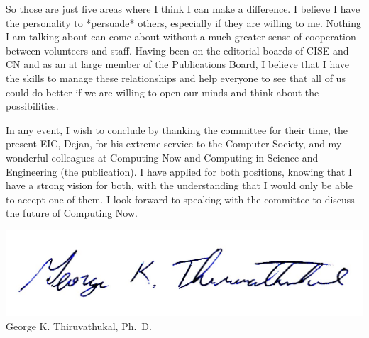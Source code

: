 \documentclass[11pt,english]{luclet}
\begin{document}
So those are just five areas where I think I can make a difference. I believe
I have the personality to *persuade* others, especially if they are willing to
me. Nothing I am talking about can come about without a much greater sense of
cooperation between volunteers and staff. Having been on the editorial boards
of CISE and CN and as an at large member of the Publications Board, I believe
that I have the skills to manage these relationships and help everyone to see
that all of us could do better if we are willing to open our minds and think
about the possibilities. 

In any event, I wish to conclude by thanking the committee for their time, the
present EIC, Dejan, for his extreme service to the Computer Society, and my
wonderful colleagues at Computing Now and Computing in Science and Engineering
(the publication). I have applied for both positions, knowing that I have a
strong vision for both, with the understanding that I would only be able to
accept one of them. I look forward to speaking with the committee to discuss
the future of Computing Now.

\includegraphics[scale=0.7]{signature.jpg}\\
George K. Thiruvathukal, Ph.\ D.
\end{document}
